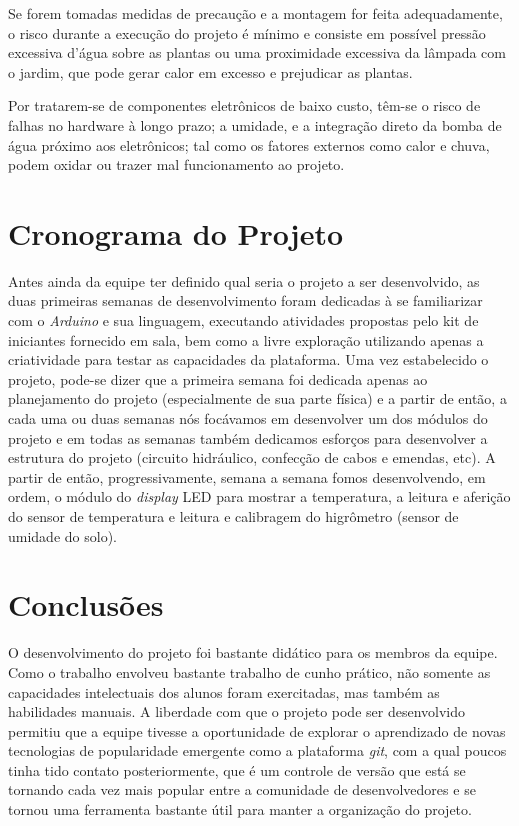 \documentclass[a4paper,12pt]{article}
\begin{document}
    Se forem tomadas medidas de precaução e a montagem for feita adequadamente, o risco durante a execução do projeto é mínimo e consiste em possível pressão excessiva d’água sobre as plantas ou uma proximidade excessiva da lâmpada com o jardim, que pode gerar calor em excesso e prejudicar as plantas.

    Por tratarem-se de componentes eletrônicos de baixo custo, têm-se o risco de falhas no hardware à longo prazo; a umidade, e a integração direto da bomba de água próximo aos eletrônicos; tal como os fatores externos como calor e chuva, podem oxidar ou trazer mal funcionamento ao projeto.



\section{Cronograma do Projeto}
Antes ainda da equipe ter definido qual seria o projeto a ser desenvolvido, as duas primeiras semanas de desenvolvimento foram dedicadas à se familiarizar com o \textit{Arduino} e sua linguagem, executando atividades propostas pelo kit de iniciantes fornecido em sala, bem como a livre exploração utilizando apenas a criatividade para testar as capacidades da plataforma. Uma vez estabelecido o projeto, pode-se dizer que a primeira semana foi dedicada apenas ao planejamento do projeto (especialmente de sua parte física) e a partir de então, a cada uma ou duas semanas nós focávamos em desenvolver um dos módulos do projeto e em todas as semanas também dedicamos esforços para desenvolver a estrutura do projeto (circuito hidráulico, confecção de cabos e emendas, etc). A partir de então, progressivamente, semana a semana fomos desenvolvendo, em ordem, o módulo do \textit{display} LED para mostrar a temperatura, a leitura e aferição do sensor de temperatura e leitura e calibragem do higrômetro (sensor de umidade do solo).

\newpage
\section{Conclusões}
O desenvolvimento do projeto foi bastante didático para os membros da equipe. Como o trabalho envolveu bastante trabalho de cunho prático, não somente as capacidades intelectuais dos alunos foram exercitadas, mas também as habilidades manuais. A liberdade com que o projeto pode ser desenvolvido permitiu que a equipe tivesse a oportunidade de explorar o aprendizado de novas tecnologias de popularidade emergente como a plataforma \textit{git}, com a qual poucos tinha tido contato posteriormente, que é um controle de versão que está se tornando cada vez mais popular entre a comunidade de desenvolvedores e se tornou uma ferramenta bastante útil para manter a organização do projeto.
\end{document}
